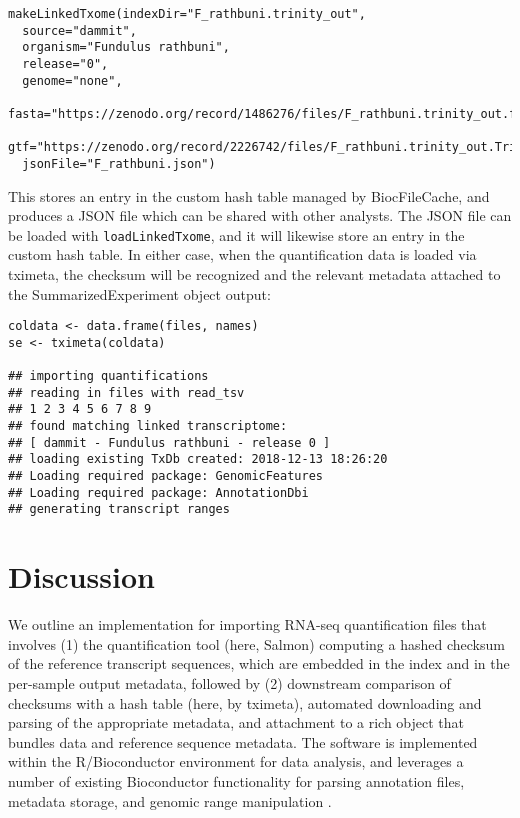 \documentclass[12pt]{article}
\begin{document}
\begin{verbatim}
makeLinkedTxome(indexDir="F_rathbuni.trinity_out",
  source="dammit",
  organism="Fundulus rathbuni",
  release="0",
  genome="none",
  fasta="https://zenodo.org/record/1486276/files/F_rathbuni.trinity_out.fasta",
  gtf="https://zenodo.org/record/2226742/files/F_rathbuni.trinity_out.Trinity.fasta.dammit.gff3",
  jsonFile="F_rathbuni.json")
\end{verbatim}

This stores an entry in the custom hash table managed by BiocFileCache, and produces a JSON file which can be shared with other analysts. The JSON file can be loaded with \texttt{loadLinkedTxome}, and it will likewise store an entry in the custom hash table. In either case, when the quantification data is loaded via tximeta, the checksum will be recognized and the relevant metadata attached to the SummarizedExperiment object output:

\begin{verbatim}
coldata <- data.frame(files, names)
se <- tximeta(coldata)

## importing quantifications
## reading in files with read_tsv
## 1 2 3 4 5 6 7 8 9 
## found matching linked transcriptome:
## [ dammit - Fundulus rathbuni - release 0 ]
## loading existing TxDb created: 2018-12-13 18:26:20
## Loading required package: GenomicFeatures
## Loading required package: AnnotationDbi
## generating transcript ranges
\end{verbatim}

\section*{Discussion}

We outline an implementation for importing RNA-seq quantification files that involves (1) the quantification tool (here, Salmon) computing a hashed checksum of the reference transcript sequences, which are embedded in the index and in the per-sample output metadata, followed by (2) downstream comparison of checksums with a hash table (here, by tximeta), automated downloading and parsing of the appropriate metadata, and attachment to a rich object that bundles data and reference sequence metadata. The software is implemented within the R/Bioconductor environment for data analysis, and leverages a number of existing Bioconductor functionality for parsing annotation files, metadata storage, and genomic range manipulation \citep{bioc,biocfilecache,granges}.
\end{document}
